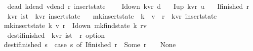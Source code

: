 \begin{isabellebody}
\isamarkupfalse%
\ {\isacharparenleft}dead\ {\isacharprime}k{\isacharcomma}dead\ {\isacharprime}v{\isacharcomma}dead\ {\isacharprime}r{\isacharparenright}\ insert{\isacharunderscore}state\ {\isacharequal}\ \isanewline
\ \ I{\isacharunderscore}down\ {\isachardoublequoteopen}{\isacharparenleft}{\isacharprime}k{\isacharcomma}{\isacharprime}v{\isacharcomma}{\isacharprime}r{\isacharparenright}\ d{\isachardoublequoteclose}\isanewline
\ \ {\isacharbar}\ I{\isacharunderscore}up\ {\isachardoublequoteopen}{\isacharparenleft}{\isacharprime}k{\isacharcomma}{\isacharprime}v{\isacharcomma}{\isacharprime}r{\isacharparenright}\ u{\isachardoublequoteclose}\isanewline
\ \ {\isacharbar}\ I{\isacharunderscore}finished\ {\isacharprime}r\isanewline
\isanewline
{}\isamarkupfalse%
\ {\isacharparenleft}{\isacharprime}k{\isacharcomma}{\isacharprime}v{\isacharcomma}{\isacharprime}r{\isacharparenright}\ ist\ {\isacharequal}\ {\isachardoublequoteopen}{\isacharparenleft}{\isacharprime}k{\isacharcomma}{\isacharprime}v{\isacharcomma}{\isacharprime}r{\isacharparenright}\ insert{\isacharunderscore}state{\isachardoublequoteclose}\ \ \isanewline
\isanewline
{}\isamarkupfalse%
\ mk{\isacharunderscore}insert{\isacharunderscore}state\ {\isacharcolon}{\isacharcolon}\ {\isachardoublequoteopen}{\isacharprime}k\ {\isasymRightarrow}\ {\isacharprime}v\ {\isasymRightarrow}\ {\isacharprime}r\ {\isasymRightarrow}\ {\isacharparenleft}{\isacharprime}k{\isacharcomma}{\isacharprime}v{\isacharcomma}{\isacharprime}r{\isacharparenright}\ insert{\isacharunderscore}state{\isachardoublequoteclose}\ \isanewline
{\isachardoublequoteopen}mk{\isacharunderscore}insert{\isacharunderscore}state\ k\ v\ r\ {\isacharequal}\ {\isacharparenleft}I{\isacharunderscore}down\ {\isacharparenleft}mk{\isacharunderscore}find{\isacharunderscore}state\ k\ r{\isacharcomma}v{\isacharparenright}{\isacharparenright}{\isachardoublequoteclose}\isanewline
\isanewline
\isanewline
{}\isamarkupfalse%
\ dest{\isacharunderscore}i{\isacharunderscore}finished\ {\isacharcolon}{\isacharcolon}\ {\isachardoublequoteopen}{\isacharparenleft}{\isacharprime}k{\isacharcomma}{\isacharprime}v{\isacharcomma}{\isacharprime}r{\isacharparenright}\ ist\ {\isasymRightarrow}\ {\isacharprime}r\ option{\isachardoublequoteclose}\ \isanewline
{\isachardoublequoteopen}dest{\isacharunderscore}i{\isacharunderscore}finished\ s\ {\isacharequal}\ {\isacharparenleft}case\ s\ of\ I{\isacharunderscore}finished\ r\ {\isasymRightarrow}\ Some\ r\ {\isacharbar}\ {\isacharunderscore}\ {\isasymRightarrow}\ None{\isacharparenright}{\isachardoublequoteclose}\isanewline

\end{isabellebody}
